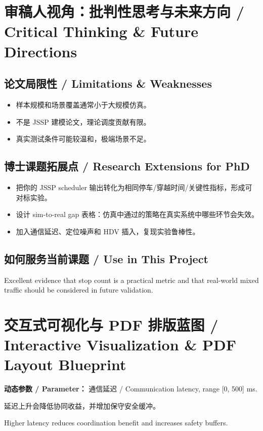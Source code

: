 \documentclass[UTF8,a4paper,11pt,fontset=fandol]{ctexart}
\begin{document}
\section{审稿人视角：批判性思考与未来方向 / Critical Thinking \& Future Directions}
\subsection{论文局限性 / Limitations \& Weaknesses}
\begin{itemize}
\item 样本规模和场景覆盖通常小于大规模仿真。
\item 不是 JSSP 建模论文，理论调度贡献有限。
\item 真实测试条件可能较温和，极端场景不足。
\end{itemize}


\subsection{博士课题拓展点 / Research Extensions for PhD}
\begin{itemize}
\item 把你的 JSSP scheduler 输出转化为相同停车/穿越时间/关键性指标，形成可对标实验。
\item 设计 sim-to-real gap 表格：仿真中通过的策略在真实系统中哪些环节会失效。
\item 加入通信延迟、定位噪声和 HDV 插入，复现实验鲁棒性。
\end{itemize}


\subsection{如何服务当前课题 / Use in This Project}
Excellent evidence that stop count is a practical metric and that real-world mixed traffic should be considered in future validation.

\section{交互式可视化与 PDF 排版蓝图 / Interactive Visualization \& PDF Layout Blueprint}
\textbf{动态参数 / Parameter：} 通信延迟 / Communication latency, range [0, 500] ms.

延迟上升会降低协同收益，并增加保守安全缓冲。

Higher latency reduces coordination benefit and increases safety buffers.
\end{document}
